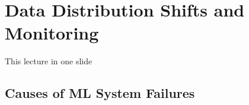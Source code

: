 
\section[Distribution Shifts]{Data Distribution Shifts and Monitoring}


\begin{frame}{This lecture in one slide}
  \begin{withmargin}
    \begin{tdmain}
    \end{tdmain}
    \begin{tdmargin}
    \end{tdmargin}
  \end{withmargin}
\end{frame}

\subsection{Causes of ML System Failures}

